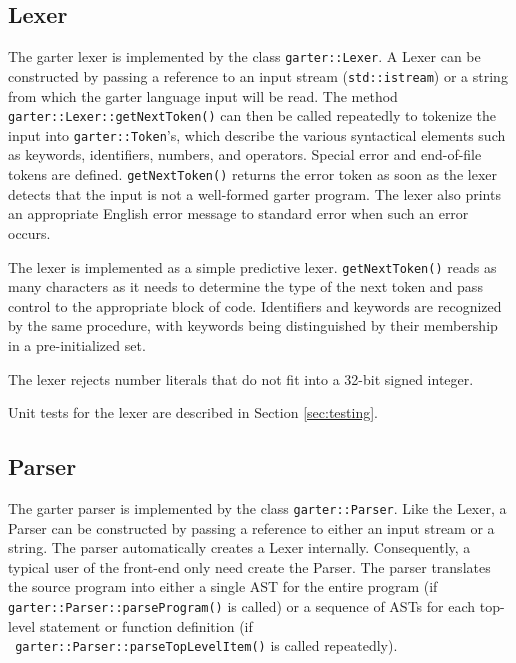 \documentclass[11pt]{article}
\begin{document}
\subsection{Lexer}

\label{sec:Lexer}

The garter lexer is implemented by the class {\tt garter::Lexer}.  A Lexer can
be constructed by passing a reference to an input stream ({\tt std::istream}) or
a string from which the garter language input will be read.  The method {\tt
garter::Lexer::getNextToken()} can then be called repeatedly to tokenize the
input into {\tt garter::Token}'s, which describe the various syntactical
elements such as keywords, identifiers, numbers, and operators.  Special error
and end-of-file tokens are defined.  {\tt getNextToken()} returns the error
token as soon as the lexer detects that the input is not a well-formed garter
program.  The lexer also prints an appropriate English error message to standard
error when such an error occurs.

The lexer is implemented as a simple predictive lexer.  {\tt getNextToken()}
reads as many characters as it needs to determine the type of the next token and
pass control to the appropriate block of code.  Identifiers and keywords are
recognized by the same procedure, with keywords being distinguished by their
membership in a pre-initialized set.

The lexer rejects number literals that do not fit into a 32-bit signed integer.

Unit tests for the lexer are described in Section \ref{sec:testing}.

\subsection{Parser}

\label{sec:Parser}

The garter parser is implemented by the class {\tt garter::Parser}.  Like the
Lexer, a Parser can be constructed by passing a reference to either an input
stream or a string.  The parser automatically creates a Lexer internally.
Consequently, a typical user of the front-end only need create the Parser.  The
parser translates the source program into either a single AST for the entire
program (if {\tt garter::Parser::parseProgram()} is called) or a sequence of
ASTs for each top-level statement or function definition (if \\{\tt
garter::Parser::parseTopLevelItem()} is called repeatedly).
\end{document}
